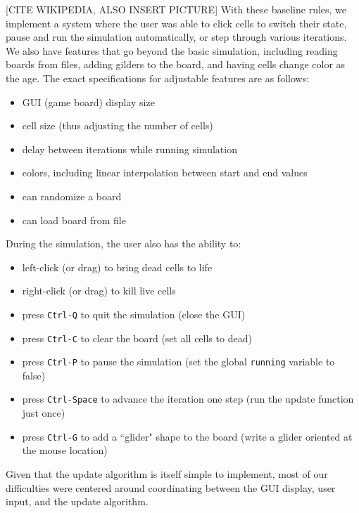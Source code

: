 \documentclass[onecolumn,12pt]{IEEEtran}
\begin{document}

[CITE WIKIPEDIA, ALSO INSERT PICTURE] With these baseline rules, we implement a
system where the user was able to click cells to switch their state, pause and
run the simulation automatically, or step through various iterations. We also
have features that go beyond the basic simulation, including reading boards
from files, adding gilders to the board, and having cells change color as the
age. The exact specifications for adjustable features are as follows:
\begin{itemize}
    \item GUI (game board) display size
    \item cell size (thus adjusting the number of cells) 
    \item delay between iterations while running simulation
    \item colors, including linear interpolation between start and end values
    \item can randomize a board
    \item can load board from file
\end{itemize} 
During the simulation, the user also has the ability to: 
\begin{itemize}
    \item left-click (or drag) to bring dead cells to life
    \item right-click (or drag) to kill live cells
    \item press \texttt{Ctrl-Q} to quit the simulation (close the GUI) 
    \item press \texttt{Ctrl-C} to clear the board (set all cells to dead) 
    \item press \texttt{Ctrl-P} to pause the simulation (set the global
        \texttt{running} variable to false)
    \item press \texttt{Ctrl-Space} to advance the iteration one step (run the
        update function just once)
    \item press \texttt{Ctrl-G} to add a ``glider" shape to the board (write a
        glider oriented at the mouse location)
\end{itemize} 
Given that the update algorithm is itself simple to implement, most of our
difficulties were centered around coordinating between the GUI display, user
input, and the update algorithm.	
	
\end{document}
